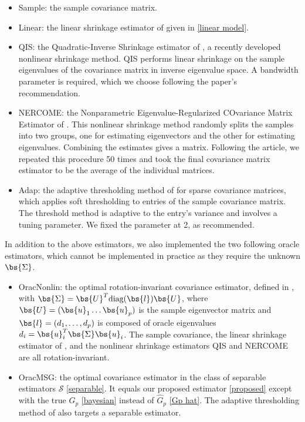 \begin{itemize}
\item Sample: the sample covariance matrix.
  
\item Linear: the linear shrinkage estimator of \citet{ledoit2004well} given in \eqref{linear model}.
  
\item QIS: the Quadratic-Inverse Shrinkage estimator of \citet{ledoit2019quadratic}, a recently developed nonlinear shrinkage method. QIS performs linear shrinkage on the sample eigenvalues of the covariance matrix in inverse eigenvalue space. A bandwidth parameter is required, which we choose following the paper's recommendation.
  
\item NERCOME: the Nonparametric Eigenvalue-Regularized COvariance Matrix Estimator of \citet{lam2016nonparametric}. This nonlinear shrinkage method randomly splits the samples into two groups, one for estimating eigenvectors and the other for estimating eigenvalues. Combining the estimates gives a matrix. Following the article, we repeated this procedure 50 times and took the final covariance matrix estimator to be the average of the individual matrices.
  
\item Adap: the adaptive thresholding method of \citep{cai2011adaptive} for sparse covariance matrices, which applies soft thresholding to entries of the sample covariance matrix. The threshold method is adaptive to the entry's variance and involves a tuning parameter. We fixed the parameter at 2, as recommended.
\end{itemize}

In addition to the above estimators, we also implemented the two following oracle estimators, which cannot be implemented in practice as they require the unknown $\bs{\Sigma}$.
\begin{itemize}
\item OracNonlin: the optimal rotation-invariant covariance estimator, defined in \citet{ledoit2019quadratic}, with $\bs{\Sigma} = \bs{U}^T\text{diag}(\bs{l})\bs{U}$, where $\bs{U}=(\bs{u}_1\ldots\bs{u}_p)$ is the sample eigenvector matrix and $\bs{l} = (d_1, \ldots, d_p)$ is composed of oracle eigenvalues $d_i = \bs{u}_i^T\bs{\Sigma} \bs{u}_i$. The sample covariance, the linear shrinkage estimator of \citet{ledoit2004well}, and the nonlinear shrinkage estimators QIS and NERCOME are all rotation-invariant.
  
\item OracMSG: the optimal covariance estimator in the class of separable estimators $\mathcal{S}$ \eqref{separable}. It equals our proposed estimator \eqref{proposed} except with the true $G_p$ \eqref{bayesian} instead of $\hat{G}_p$ \eqref{Gp hat}. The adaptive thresholding method of \citet{cai2011adaptive} also targets a separable estimator.
\end{itemize}

